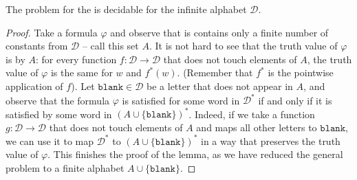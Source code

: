 \begin{lemma}
    \label{lem:fo-emptiness}
    The  problem for the  is decidable for the infinite alphabet $\mathcal{D}$.
\end{lemma}
\begin{proof}
    Take a formula $\varphi$ and observe that is contains only a finite number of constants from $\mathcal{D}$ -- call this set $A$.
    It is not hard to see that the truth value of $\varphi$ is  by $A$: for every function $f : \mathcal{D} \to \mathcal{D}$
    that does not touch 
    elements of $A$, the truth value of $\varphi$ is the same for $w$ and $f^*(w)$. (Remember that 
    $f^*$ is the pointwise application of $f$). 
    Let $\mathtt{blank} \in \mathcal{D}$ be a letter that does not appear in $A$,
    and observe that the formula $\varphi$ is satisfied for some word in $\mathcal{D}^*$ if and only if it is satisfied by
    some word in $(A \cup \{\mathtt{blank}\})^*$. Indeed, if we take a function $g: \mathcal{D} \to \mathcal{D}$ that does not touch elements of $A$
    and maps all other letters to $\mathtt{blank}$, we can use it to map $\mathcal{D}^*$ to $(A \cup \{\mathtt{blank}\})^*$ in a way 
    that preserves the truth value of $\varphi$.
    This finishes the proof of the lemma, as we have reduced the general problem to a finite alphabet $A \cup \{\mathtt{blank}\}$.
\end{proof}

